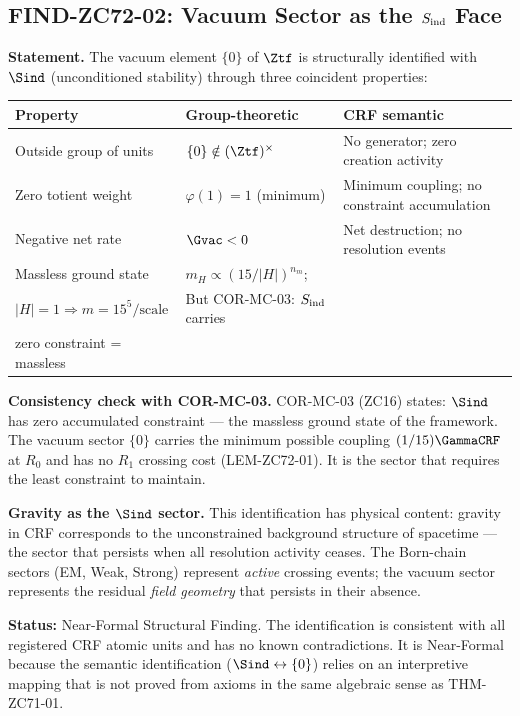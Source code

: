 \documentclass[12pt, a4paper]{article}
\begin{document}
\subsection{FIND-ZC72-02: Vacuum Sector as the $S_{\rm ind}$ Face}
\label{sec:find02}

\begin{derivedbox}[title={FIND-ZC72-02: $\{0\} \subset \Ztf$ as the $\Sind$
  Structural Face ($R_0$, Near-Formal)}]

\textbf{Statement.}
The vacuum element $\{0\}$ of $\Ztf$ is structurally identified
with $\Sind$ (unconditioned stability) through three coincident properties:

\medskip
\begin{center}
\renewcommand{\arraystretch}{1.35}
\begin{tabular}{@{}p{5.0cm}p{4.0cm}p{4.0cm}@{}}
\toprule
\textbf{Property} & \textbf{Group-theoretic} & \textbf{CRF semantic} \\
\midrule
Outside group of units &
  $\{0\} \notin (\Ztf)^\times$ &
  No generator; zero creation activity \\
Zero totient weight &
  $\varphi(1) = 1$ (minimum) &
  Minimum coupling; no constraint accumulation \\
Negative net rate &
  $\Gvac < 0$ &
  Net destruction; no resolution events \\
Massless ground state &
  $m_H \propto (15/|H|)^{n_m}$;\\$|H|=1 \Rightarrow m=15^5/\text{scale}$&
  But COR-MC-03: $S_{\rm ind}$ carries\\zero constraint = massless \\
\bottomrule
\end{tabular}
\end{center}

\medskip
\textbf{Consistency check with COR-MC-03.}
COR-MC-03 (ZC16) states: $\Sind$ has zero accumulated constraint ---
the massless ground state of the framework.
The vacuum sector $\{0\}$ carries the minimum possible coupling
$(1/15)\GammaCRF$ at $R_0$ and has no $R_1$ crossing cost
(LEM-ZC72-01). It is the sector that requires the least constraint
to maintain.

\textbf{Gravity as the $\Sind$ sector.}
This identification has physical content: gravity in CRF
corresponds to the unconstrained background structure of
spacetime --- the sector that persists when all resolution
activity ceases. The Born-chain sectors (EM, Weak, Strong)
represent \emph{active} crossing events; the vacuum sector
represents the residual \emph{field geometry} that persists
in their absence.

\textbf{Status:} Near-Formal Structural Finding.
The identification is consistent with all registered CRF atomic units
and has no known contradictions. It is Near-Formal because
the semantic identification ($\Sind \leftrightarrow \{0\}$)
relies on an interpretive mapping that is not proved from axioms
in the same algebraic sense as THM-ZC71-01.
\end{derivedbox}
\end{document}
